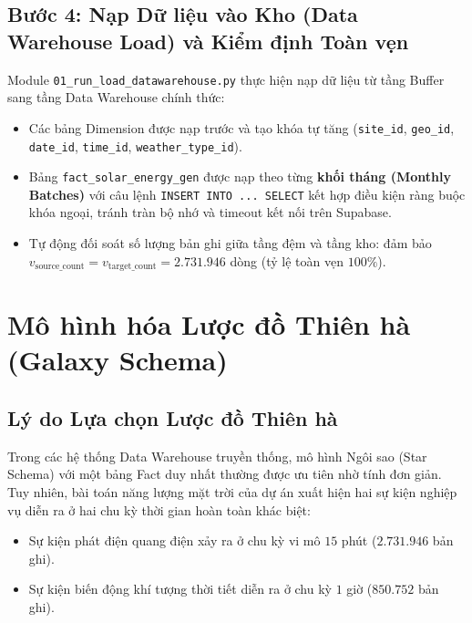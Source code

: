 \documentclass[12pt, a4paper]{report}
\begin{document}
\subsection{Bước 4: Nạp Dữ liệu vào Kho (Data Warehouse Load) và Kiểm định Toàn vẹn}
Module \texttt{01\_run\_load\_datawarehouse.py} thực hiện nạp dữ liệu từ tầng Buffer sang tầng Data Warehouse chính thức:
\begin{itemize}[leftmargin=*]
    \item Các bảng Dimension được nạp trước và tạo khóa tự tăng (\texttt{site\_id}, \texttt{geo\_id}, \texttt{date\_id}, \texttt{time\_id}, \texttt{weather\_type\_id}).
    \item Bảng \texttt{fact\_solar\_energy\_gen} được nạp theo từng \textbf{khối tháng (Monthly Batches)} với câu lệnh \texttt{INSERT INTO ... SELECT} kết hợp điều kiện ràng buộc khóa ngoại, tránh tràn bộ nhớ và timeout kết nối trên Supabase.
    \item Tự động đối soát số lượng bản ghi giữa tầng đệm và tầng kho: đảm bảo $v_{\text{source\_count}} = v_{\text{target\_count}} = 2.731.946$ dòng (tỷ lệ toàn vẹn $100\%$).
\end{itemize}
\newpage
\section{Mô hình hóa Lược đồ Thiên hà (Galaxy Schema)}
\label{sec:galaxy_modeling}

\subsection{Lý do Lựa chọn Lược đồ Thiên hà}
Trong các hệ thống Data Warehouse truyền thống, mô hình Ngôi sao (Star Schema) với một bảng Fact duy nhất thường được ưu tiên nhờ tính đơn giản. Tuy nhiên, bài toán năng lượng mặt trời của dự án xuất hiện hai sự kiện nghiệp vụ diễn ra ở hai chu kỳ thời gian hoàn toàn khác biệt:
\begin{itemize}[noitemsep]
    \item Sự kiện phát điện quang điện xảy ra ở chu kỳ vi mô $15$ phút ($2.731.946$ bản ghi).
    \item Sự kiện biến động khí tượng thời tiết diễn ra ở chu kỳ $1$ giờ ($850.752$ bản ghi).
\end{itemize}
\end{document}

